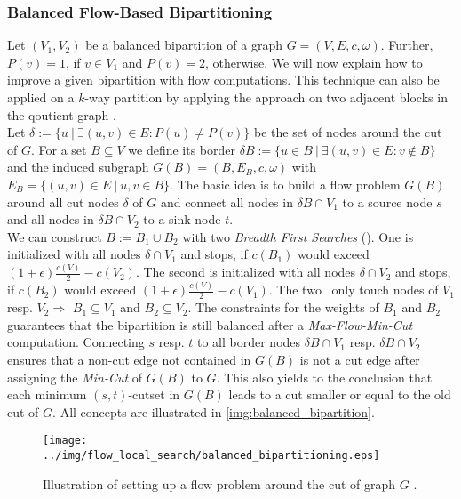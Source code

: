 \subsubsection{Balanced Flow-Based Bipartitioning}
\label{sec:balanced_bipartitioning}
Let $(V_1,V_2)$ be a balanced bipartition of a graph $G = (V,E,c,\omega)$. 
Further, $P(v) = 1$, if $v \in V_1$ and
$P(v) = 2$, otherwise. We will now explain how to improve a given
bipartition with flow computations. This technique can also be applied on a $k$-way 
partition by applying the approach on two adjacent blocks in the qoutient graph \cite{sanders2011engineering}. \\
Let $\delta := \{ u\ |\ \exists (u,v) \in E: P(u) \neq P(v) \}$ be the set of nodes
around the cut of $G$. For a set $B \subseteq V$ we define its border 
$\delta B := \{u \in B\ |\ \exists (u,v) \in E: v \notin B\}$ and the induced subgraph
$G(B) = (B,E_B,c,\omega)$ with $E_B = \{(u,v) \in E\ |\ u, v \in B\}$. 
The basic idea is to build a flow problem $G(B)$ around all cut nodes $\delta$ of 
$G$ and connect all nodes in $\delta B \cap V_1$ to a source node $s$ and all nodes in 
$\delta B \cap V_2$ to a sink node $t$. \\
We can construct $B := B_1 \cup B_2$ with two \emph{Breadth First Searches} (\BFS). 
One is initialized with all nodes $\delta \cap V_1$ and stops, if $c(B_1)$ would 
exceed $(1+\epsilon)\frac{c(V)}{2} - c(V_2)$. The second is initialized with 
all nodes $\delta \cap V_2$ and stops, if $c(B_2)$ would exceed 
$(1+\epsilon)\frac{c(V)}{2} - c(V_1)$. The two \BFS~only touch nodes of $V_1$ resp. $V_2 \Rightarrow$
$B_1 \subseteq V_1$ and $B_2 \subseteq V_2$. The constraints for the weights of $B_1$
and $B_2$ guarantees that the bipartition is still balanced after a \emph{Max-Flow-Min-Cut}
computation. Connecting $s$ resp. $t$ to all border nodes $\delta B \cap V_1$ resp.
$\delta B \cap V_2$ ensures that a non-cut edge not contained in $G(B)$ is not a cut edge after
assigning the \emph{Min-Cut} of $G(B)$ to $G$. This also yields to the conclusion that each
minimum $(s,t)$-cutset in $G(B)$ leads to a cut smaller or equal to the old cut of $G$. All
concepts are illustrated in \autoref{img:balanced_bipartition}.

\begin{figure}
\centering
\texttt{[image: ../img/flow\_local\_search/balanced\_bipartitioning.eps]}
\caption{Illustration of setting up a flow problem around the cut of graph $G$ \cite{andersen2008algorithm}.}
\label{img:balanced_bipartition}
\end{figure}

